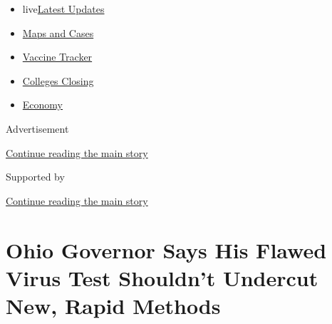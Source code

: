 \begin{itemize}
\tightlist
\item
  live\href{https://www.nytimes3xbfgragh.onion/2020/08/21/world/covid-19-coronavirus.html?name=styln-coronavirus-national\&region=TOP_BANNER\&variant=undefined\&block=storyline_menu_recirc\&action=click\&pgtype=Article\&impression_id=edb0a131-e3ab-11ea-af8a-cf9df229f915}{Latest
  Updates}
\item
  \href{https://www.nytimes3xbfgragh.onion/interactive/2020/us/coronavirus-us-cases.html?name=styln-coronavirus-national\&region=TOP_BANNER\&variant=undefined\&block=storyline_menu_recirc\&action=click\&pgtype=Article\&impression_id=edb0c840-e3ab-11ea-af8a-cf9df229f915}{Maps
  and Cases}
\item
  \href{https://www.nytimes3xbfgragh.onion/interactive/2020/science/coronavirus-vaccine-tracker.html?name=styln-coronavirus-national\&region=TOP_BANNER\&variant=undefined\&block=storyline_menu_recirc\&action=click\&pgtype=Article\&impression_id=edb0c841-e3ab-11ea-af8a-cf9df229f915}{Vaccine
  Tracker}
\item
  \href{https://www.nytimes3xbfgragh.onion/2020/08/19/us/colleges-closing-covid.html?name=styln-coronavirus-national\&region=TOP_BANNER\&variant=undefined\&block=storyline_menu_recirc\&action=click\&pgtype=Article\&impression_id=edb0c842-e3ab-11ea-af8a-cf9df229f915}{Colleges
  Closing}
\item
  \href{https://www.nytimes3xbfgragh.onion/live/2020/08/21/business/stock-market-today-coronavirus?name=styln-coronavirus-national\&region=TOP_BANNER\&variant=undefined\&block=storyline_menu_recirc\&action=click\&pgtype=Article\&impression_id=edb0c843-e3ab-11ea-af8a-cf9df229f915}{Economy}
\end{itemize}

Advertisement

\protect\hyperlink{after-top}{Continue reading the main story}

Supported by

\protect\hyperlink{after-sponsor}{Continue reading the main story}

\hypertarget{ohio-governor-says-his-flawed-virus-test-shouldnt-undercut-new-rapid-methods}{%
\section{Ohio Governor Says His Flawed Virus Test Shouldn't Undercut
New, Rapid
Methods}\label{ohio-governor-says-his-flawed-virus-test-shouldnt-undercut-new-rapid-methods}}


